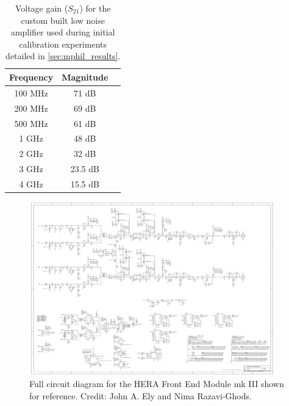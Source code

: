 \begin{table}
    \centering
    \begin{tabular}{ |c|c|c| }
        \hline
        Frequency & Magnitude \\
        \hline 
        100 MHz & 71 dB \\
        200 MHz & 69 dB \\
        500 MHz & 61 dB \\
        1 GHz & 48 dB \\
        2 GHz & 32 dB \\
        3 GHz & 23.5 dB \\
        4 GHz & 15.5 dB \\
        \hline 
    \end{tabular}
    \caption{Voltage gain ($S_{21}$) for the custom built low noise amplifier used during initial calibration experiments detailed in \cref{sec:mphil_results}.}
    \label{tab:mphil_lna}
\end{table}

\begin{figure}
    \centering
    \includegraphics[angle=90,width=0.95\textwidth]{fem_schematic}
    \caption{Full circuit diagram for the HERA Front End Module mk III shown for reference. Credit: John A. Ely and Nima Razavi-Ghods.}
    \label{fig:fem_schematic}
\end{figure}

